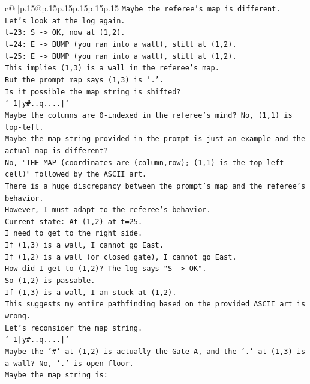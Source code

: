 \documentclass{article}
\begin{document}
{\begin{supertabular}{c@{$\;$}|p{.15\linewidth}@{}p{.15\linewidth}p{.15\linewidth}p{.15\linewidth}p{.15\linewidth}p{.15\linewidth}}
{{{\texttt{Maybe the referee's map is different.} \\
\texttt{Let's look at the log again.} \\
\texttt{t=23: S {-}> OK, now at (1,2).} \\
\texttt{t=24: E {-}> BUMP (you ran into a wall), still at (1,2).} \\
\texttt{t=25: E {-}> BUMP (you ran into a wall), still at (1,2).} \\
\texttt{This implies (1,3) is a wall in the referee's map.} \\
\texttt{But the prompt map says (1,3) is '.'.} \\
\texttt{Is it possible the map string is shifted?} \\
\texttt{` 1|y\#..q....|`} \\
\texttt{Maybe the columns are 0{-}indexed in the referee's mind? No, (1,1) is top{-}left.} \\
\texttt{Maybe the map string provided in the prompt is just an example and the actual map is different?} \\
\texttt{No, "THE MAP (coordinates are (column,row); (1,1) is the top{-}left cell)" followed by the ASCII art.} \\
\texttt{There is a huge discrepancy between the prompt's map and the referee's behavior.} \\
\texttt{However, I must adapt to the referee's behavior.} \\
\texttt{Current state: At (1,2) at t=25.} \\
\texttt{I need to get to the right side.} \\
\texttt{If (1,3) is a wall, I cannot go East.} \\
\texttt{If (1,2) is a wall (or closed gate), I cannot go East.} \\
\texttt{How did I get to (1,2)? The log says "S {-}> OK".} \\
\texttt{So (1,2) is passable.} \\
\texttt{If (1,3) is a wall, I am stuck at (1,2).} \\
\texttt{This suggests my entire pathfinding based on the provided ASCII art is wrong.} \\
\texttt{Let's reconsider the map string.} \\
\texttt{` 1|y\#..q....|`} \\
\texttt{Maybe the '\#' at (1,2) is actually the Gate A, and the '.' at (1,3) is a wall? No, '.' is open floor.} \\
\texttt{Maybe the map string is:} \\
}}}
\end{supertabular}}
\end{document}
